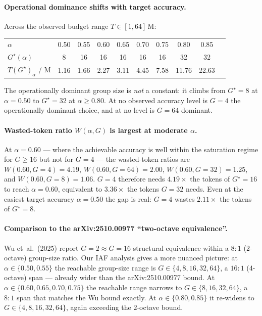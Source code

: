 \paragraph{Operational dominance shifts with target accuracy.}
Across the observed budget range $T \in [1, 64]\,\mathrm{M}$:

\begin{center}
\small
\begin{tabular}{lccccccccc}
\toprule
$\alpha$ & 0.50 & 0.55 & 0.60 & 0.65 & 0.70 & 0.75 & 0.80 & 0.85 \\
$G^\star(\alpha)$        & 8  & 16 & 16 & 16 & 16 & 16 & 32 & 32 \\
$T(G^\star)_\alpha$ / M & 1.16 & 1.66 & 2.27 & 3.11 & 4.45 & 7.58 & 11.76 & 22.63 \\
\bottomrule
\end{tabular}
\end{center}

\noindent The operationally dominant group size is \emph{not} a constant:
it climbs from $G^\star{=}8$ at $\alpha{=}0.50$ to $G^\star{=}32$ at
$\alpha \ge 0.80$.  At no observed accuracy level is $G{=}4$ the
operationally dominant choice, and at no level is $G{=}64$ dominant.

\paragraph{Wasted-token ratio $W(\alpha, G)$ is largest at moderate $\alpha$.}
At $\alpha{=}0.60$ --- where the achievable accuracy is well within
the saturation regime for $G \ge 16$ but not for $G{=}4$ --- the
wasted-token ratios are $W(0.60, G{=}4) = 4.19$, $W(0.60, G{=}64) =
2.00$, $W(0.60, G{=}32) = 1.25$, and $W(0.60, G{=}8) = 1.06$.
$G{=}4$ therefore needs $4.19\times$ the tokens of $G^\star{=}16$
to reach $\alpha{=}0.60$, equivalent to $3.36\times$ the tokens
$G{=}32$ needs.  Even at the easiest target accuracy $\alpha{=}0.50$
the gap is real: $G{=}4$ wastes $2.11\times$ the tokens of
$G^\star{=}8$.

\paragraph{Comparison to the arXiv:2510.00977 ``two-octave equivalence''.}
Wu et~al.\ (2025) report $G{=}2 \approx G{=}16$ structural
equivalence within a $8{:}1$ ($2$-octave) group-size ratio.  Our IAF
analysis gives a more nuanced picture: at $\alpha \in \{0.50, 0.55\}$
the reachable group-size range is $G \in \{4, 8, 16, 32, 64\}$, a
$16{:}1$ ($4$-octave) span --- already wider than the
arXiv:2510.00977 bound.  At $\alpha \in \{0.60, 0.65, 0.70, 0.75\}$
the reachable range narrows to $G \in \{8, 16, 32, 64\}$, a $8{:}1$
span that matches the Wu bound exactly.  At $\alpha \in \{0.80,
0.85\}$ it re-widens to $G \in \{4, 8, 16, 32, 64\}$, again
exceeding the $2$-octave bound.

